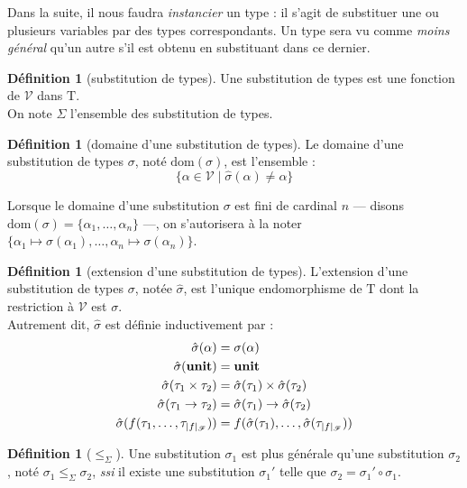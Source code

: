 \documentclass[a4paper]{report}
\theoremstyle{definition}
\newtheorem{definition}[theoreme]{Définition}
\newcommand{\ssi}{\textit{ssi}\xspace}
\newcommand{\unit}{\bold{unit}}
\newcommand{\V}{\mathscr{V}}
\newcommand{\F}{\mathscr{F}}
\newcommand{\T}{\mathrm{T}}
\begin{document}
Dans la suite, il nous faudra \emph{instancier} un type : il s'agit de substituer une ou plusieurs variables par des types correspondants. Un type sera vu comme \emph{moins général} qu'un autre s'il est obtenu en substituant dans ce dernier.

\begin{definition}[substitution de types]
  Une substitution de types est une fonction de $\V$ dans $\T$. \\
  On note $\Sigma$ l'ensemble des substitution de types.
\end{definition}

\begin{definition}[domaine d'une substitution de types]
  Le domaine d'une substitution de types $\sigma$, noté $\mathrm{dom} (\sigma)$, est l'ensemble :
  \[ \{ \alpha \in \V \mid \hat\sigma (\alpha) \neq \alpha \} \]
\end{definition}

Lorsque le domaine d'une substitution $\sigma$ est fini de cardinal $n$ — disons $\mathrm{dom} (\sigma) = \{ \alpha_1, \dots, \alpha_n \}$ —, on s'autorisera à la noter $\{ \alpha_1 \mapsto \sigma (\alpha_1), \dots, \alpha_n \mapsto \sigma (\alpha_n) \}$.

\begin{definition}[extension d'une substitution de types]
  L'extension d'une substitution de types $\sigma$, notée $\hat\sigma$, est l'unique endomorphisme de $\T$ dont la restriction à $\V$ est $\sigma$. \\
  Autrement dit, $\hat\sigma$ est définie inductivement par :
  \begin{align*}
      \hat\sigma (\alpha) &=
      \sigma (\alpha)
    \\
      \hat\sigma (\unit) &=
      \unit
    \\
      \hat\sigma (\tau_1 \times \tau_2) &=
      \hat\sigma (\tau_1) \times \hat\sigma (\tau_2)
    \\
      \hat\sigma (\tau_1 \rightarrow \tau_2) &=
      \hat\sigma (\tau_1) \rightarrow \hat\sigma (\tau_2)
    \\
      \hat\sigma (f (\tau_1, \dots, \tau_{|f|_\F})) &=
      f (\hat\sigma (\tau_1), \dots, \hat\sigma (\tau_{|f|_\F}))
  \end{align*}
\end{definition}

\begin{definition}[$\leqslant_\Sigma$]
  Une substitution $\sigma_1$ est plus générale qu'une substitution $\sigma_2$, noté $\sigma_1 \leqslant_\Sigma \sigma_2$, \ssi il existe une substitution $\sigma_1'$ telle que $\sigma_2 = \sigma_1' \circ \sigma_1$.
\end{definition}
\end{document}
